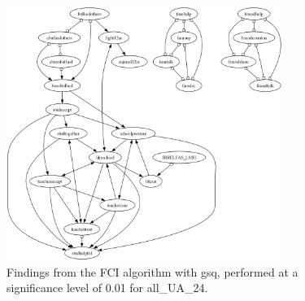 \begin{figure}[htbp]
    \centering
    \includegraphics[width=0.8\textwidth]{FCI_gsq_0.01_all_UA_24.png}
    \caption{Findings from the FCI algorithm with gsq, performed at a significance level of 0.01 for all_UA_24.}
    \label{fig:fci_gsq_0.01all_UA_24}
\end{figure}
